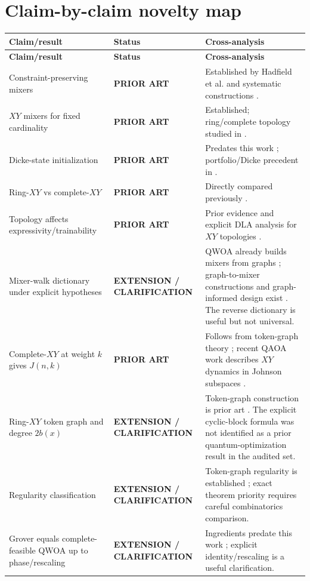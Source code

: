 \documentclass[11pt]{article}
\newcommand{\prior}{\textcolor{critical}{\textbf{PRIOR ART}}}
\newcommand{\partialnovel}{\textcolor{partial}{\textbf{EXTENSION / CLARIFICATION}}}
\begin{document}
\section{Claim-by-claim novelty map}
\renewcommand{\arraystretch}{1.2}
\begin{longtable}{p{}p{}p{}}
\toprule \textbf{Claim/result} & \textbf{Status} & \textbf{Cross-analysis}\\ \midrule
\endfirsthead
\toprule \textbf{Claim/result} & \textbf{Status} & \textbf{Cross-analysis}\\ \midrule
\endhead
Constraint-preserving mixers & \prior & Established by Hadfield et al. and systematic constructions \cite{Hadfield2019,Fuchs2022,Fuchs2024}.\\
$XY$ mixers for fixed cardinality & \prior & Established; ring/complete topology studied in \cite{Wang2020,Cook2019}.\\
Dicke-state initialization & \prior & Predates this work \cite{Bartschi2019,Cook2019,He2023}; portfolio/Dicke precedent in \cite{Scursulim2026}.\\
Ring-$XY$ vs complete-$XY$ & \prior & Directly compared previously \cite{Cook2019,Wang2020,He2023}.\\
Topology affects expressivity/trainability & \prior & Prior evidence and explicit DLA analysis for $XY$ topologies \cite{Kordonowy2026}.\\
Mixer-walk dictionary under explicit hypotheses & \partialnovel & QWOA already builds mixers from graphs \cite{Marsh2019,Marsh2020}; graph-to-mixer constructions and graph-informed design exist \cite{Fuchs2022,Matwiejew2024}. The reverse dictionary is useful but not universal.\\
Complete-$XY$ at weight $k$ gives $J(n,k)$ & \prior & Follows from token-graph theory \cite{FabilaMonroy2012Token}; recent QAOA work describes $XY$ dynamics in Johnson subspaces \cite{MinSeoHeo2026}.\\
Ring-$XY$ token graph and degree $2b(x)$ & \partialnovel & Token-graph construction is prior art \cite{FabilaMonroy2012Token,Carballosa2017Regularity}. The explicit cyclic-block formula was not identified as a prior quantum-optimization result in the audited set.\\
Regularity classification & \partialnovel & Token-graph regularity is established \cite{Carballosa2017Regularity}; exact theorem priority requires careful combinatorics comparison.\\
Grover equals complete-feasible QWOA up to phase/rescaling & \partialnovel & Ingredients predate this work \cite{Bartschi2020,Slate2021,Bridi2024}; explicit identity/rescaling is a useful clarification.\\

\end{longtable}
\end{document}
